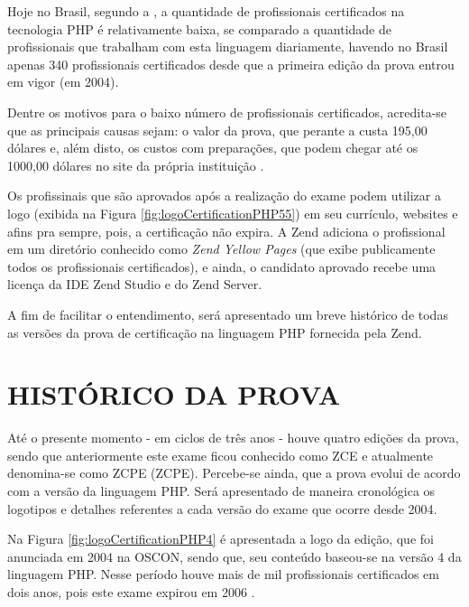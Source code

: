 Hoje no Brasil, segundo a , a
quantidade de profissionais certificados na tecnologia \acs{PHP} é relativamente
baixa, se comparado a quantidade de profissionais que trabalham com esta
linguagem diariamente, havendo no Brasil apenas 340 profissionais certificados
desde que a primeira edição da prova entrou em vigor (em 2004).

Dentre os motivos para o baixo número de profissionais certificados, acredita-se
que as principais causas sejam: o valor da prova, que perante a
 custa 195,00 dólares e, além disto,
os custos com preparações, que podem chegar até os 1000,00 dólares no site da
própria instituição \cite{websiteZendOnlineTraining}.

Os profissinais que são aprovados após a realização do exame podem utilizar a
logo (exibida na Figura \ref{fig:logoCertificationPHP55}) em seu currículo,
websites e afins pra sempre, pois, a certificação não expira. A Zend
adiciona o profissional em um diretório conhecido como \textit{Zend Yellow
Pages} (que exibe publicamente todos os profissionais certificados), e ainda, o
candidato aprovado recebe uma licença da \acs{IDE} \acs{Zend Studio} e do 
\acs{Zend Server}.

A fim de facilitar o entendimento, será apresentado um breve histórico
de todas as versões da prova de certificação na linguagem \acs{PHP} fornecida
pela \acs{Zend}.

\section{HISTÓRICO DA PROVA}

Até o presente momento - em ciclos de três anos - houve quatro edições da
prova, sendo que anteriormente este exame ficou conhecido como \ac{ZCE} e
atualmente denomina-se como \acl{ZCPE} (\acs{ZCPE}). Percebe-se ainda, que a
prova evolui de acordo com a versão da linguagem \acs{PHP}. Será apresentado de
maneira cronológica os logotipos e detalhes referentes a cada versão do exame 
que ocorre desde 2004.

Na Figura \ref{fig:logoCertificationPHP4} é apresentada a logo da edição, que
foi anunciada em 2004 na \ac{OSCON}, sendo que, seu conteúdo baseou-se na versão
4 da linguagem \acs{PHP}. Nesse período houve mais de mil profissionais
certificados em dois anos, pois este exame expirou em 2006
\cite{entrevistaAriZCEBrasil}.

